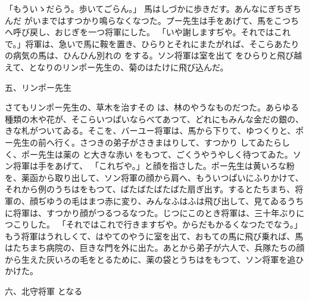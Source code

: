 \documentclass[a4paper,
tate,
book]
{jlreq}
\begin{document}
「もういゝだらう。歩いてごらん。」
  馬はしづかに歩きだす。あんなにぎちぎち んだ がいまではすつかり鳴らなくなつた。プー先生は手をあげて、馬をこつちへ呼び戻し、おじぎを一つ将軍にした。
「いや謝しますぢや。それではこれで。」将軍は、急いで馬に鞍を置き、ひらりとそれにまたがれば、そこらあたりの病気の馬は、ひんひん別れの をする。ソン将軍は室を出て をひらりと飛び越えて、となりのリンポー先生の、菊のはたけに飛び込んだ。

            五、リンポー先生

  さてもリンポー先生の、草木を治すその は、林のやうなものだつた。あらゆる種類の木や花が、そこらいつぱいならべてあつて、どれにもみんな金だの銀の、 きな札がついてゐる。そこを、バーユー将軍は、馬から下りて、ゆつくりと、ポー先生の前へ行く。さつきの弟子がさきまはりして、すつかり してゐたらしく、ポー先生は薬の と大きな赤い をもつて、ごくうやうやしく待つてゐた。ソン将軍は手をあげて、
「これぢや。」と顔を指さした。ポー先生は黄いろな粉を、薬函から取り出して、ソン将軍の顔から肩へ、もういつぱいにふりかけて、それから例のうちはをもつて、ばたばたばたばた扇ぎ出す。するとたちまち、将軍の、顔ぢゆうの毛はまつ赤に変り、みんなふはふは飛び出して、見てゐるうちに将軍は、すつかり顔がつるつるなつた。じつにこのとき将軍は、三十年ぶりにつこりした。
「それではこれで行きますぢや。からだもかるくなつたでなう。」もう将軍はうれしくて、はやてのやうに室を出て、おもての馬に飛び乗れば、馬はたちまち病院の、巨きな門を外に出た。あとから弟子が六人で、兵隊たちの顔から生えた灰いろの毛をとるために、薬の袋とうちはをもつて、ソン将軍を追ひかけた。

            六、北守将軍 となる
\end{document}
